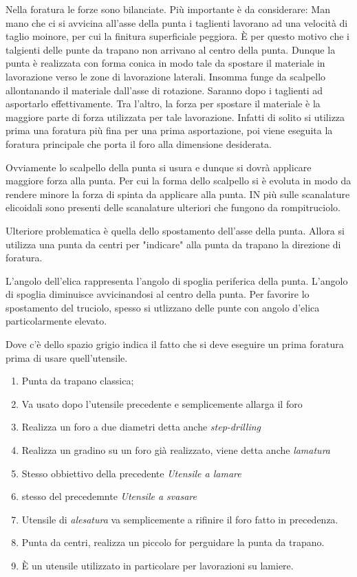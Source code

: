 
Nella foratura le forze sono bilanciate. Più importante è da considerare:
Man mano che ci si avvicina all'asse della punta i taglienti lavorano ad una velocità di taglio
moinore, per cui la finitura superficiale peggiora.
È per questo motivo che i talgienti delle punte da trapano non arrivano al centro della punta.
Dunque la punta è realizzata con forma conica in modo tale da spostare il materiale in lavorazione 
verso le zone di lavorazione laterali. Insomma funge da scalpello allontanando il materiale
dall'asse di rotazione. Saranno dopo i taglienti ad asportarlo effettivamente. 
Tra l'altro, la forza per spostare il materiale è la maggiore parte di forza utilizzata per tale lavorazione.
Infatti di solito si utilizza prima una foratura più fina per una prima asportazione, poi viene 
eseguita la foratura principale che porta il foro alla dimensione desiderata.

Ovviamente lo scalpello della punta si usura e dunque si dovrà applicare maggiore forza alla punta.
Per cui la forma dello scalpello si è evoluta in modo da rendere minore la forza di spinta da applicare alla 
punta. IN più sulle scanalature elicoidali sono presenti delle scanalature ulteriori che fungono da 
rompitruciolo.

Ulteriore problematica è quella dello spostamento dell'asse della punta. Allora si utilizza una punta
da centri per "indicare" alla punta da trapano la direzione di foratura.

L'angolo dell'elica rappresenta l'angolo di spoglia periferica della punta.
L'angolo di spoglia diminuisce avvicinandosi al centro della punta.
Per favorire lo spostamento del truciolo, spesso si utlizzano delle punte con angolo d'elica particolarmente 
elevato.


Dove c'è dello spazio grigio indica il fatto che si deve eseguire un prima foratura prima di usare 
quell'utensile.

\begin{enumerate}
\item Punta da trapano classica;
\item Va usato dopo l'utensile precedente e semplicemente allarga il foro
\item Realizza un foro a due diametri detta anche \emph{step-drilling}
\item Realizza un gradino su un foro già realizzato, viene detta anche \emph{lamatura}
\item Stesso obbiettivo della precedente \emph{Utensile a lamare}
\item stesso del precedemnte \emph{Utensile a svasare}
\item Utensile di \emph{alesatura} va semplicemente a rifinire il foro fatto in precedenza.
\item Punta da centri, realizza un piccolo for perguidare la punta da trapano.
\item È un utensile utilizzato in particolare per lavorazioni su lamiere.
\end{enumerate}

